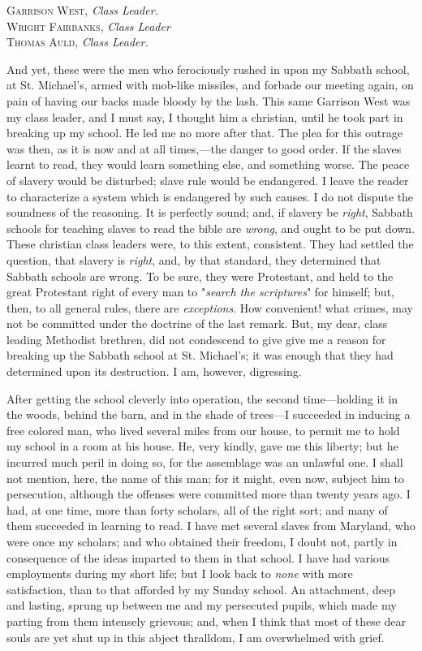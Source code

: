 \textsc{Garrison West}, \emph{Class Leader.}\\
\textsc{Wright Fairbanks}, \emph{Class Leader}\\
\textsc{Thomas Auld}, \emph{Class Leader.}

And yet, these were the men who ferociously rushed in upon my Sabbath
school, at St. Michael's, armed with mob-like missiles, and forbade our
meeting again, on pain of having our backs made bloody by the lash. This
same Garrison West was my class leader, and I must say, I thought him a
christian, until he took part in breaking up my school. He led me no
more after that. The plea for this outrage was then, as it is now and at
all times,---the danger to good order. If the slaves learnt to read,
they would learn something else, and something worse. The peace of
slavery would be disturbed; slave rule would be endangered. I leave the
reader to characterize a system which is endangered by such causes. I do
not dispute the soundness of the reasoning. It is perfectly sound; and,
if slavery be \emph{right}, Sabbath schools for teaching slaves to read
the bible are \emph{wrong}, and ought to be put down. These christian
class leaders were, to this extent, consistent. They had settled the
question, that slavery is \emph{right}, and, by that standard, they
determined that Sabbath schools are wrong. To be sure, they were
Protestant, and held to the great Protestant right of every man to
"\emph{search the scriptures}" for himself; but, then, to all general
rules, there are \emph{exceptions}. How convenient! what crimes, may not
{}be committed under the doctrine of the last remark. But, my dear,
class leading Methodist brethren, did not condescend to give give me a
reason for breaking up the Sabbath school at St. Michael's; it was
enough that they had determined upon its destruction. I am, however,
digressing.

After getting the school cleverly into operation, the second
time---holding it in the woods, behind the barn, and in the shade of
trees---I succeeded in inducing a free colored man, who lived several
miles from our house, to permit me to hold my school in a room at his
house. He, very kindly, gave me this liberty; but he incurred much peril
in doing so, for the assemblage was an unlawful one. I shall not
mention, here, the name of this man; for it might, even now, subject him
to persecution, although the offenses were committed more than twenty
years ago. I had, at one time, more than forty scholars, all of the
right sort; and many of them succeeded in learning to read. I have met
several slaves from Maryland, who were once my scholars; and who
obtained their freedom, I doubt not, partly in consequence of the ideas
imparted to them in that school. I have had various employments during
my short life; but I look back to \emph{none} with more satisfaction,
than to that afforded by my Sunday school. An attachment, deep and
lasting, sprung up between me and my persecuted pupils, which made my
parting from them intensely grievous; and, when I think that most of
these dear souls are yet shut up in this abject thralldom, I am
overwhelmed with grief.

